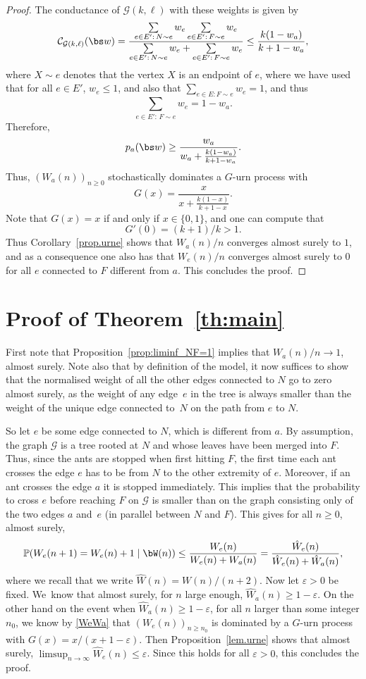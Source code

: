 \begin{proof}
The conductance of $\mathcal G(k,\ell)$ with these weights is given by
\[
\mathcal C_{\mathcal G(k,\ell)}(\bs w) = \frac{\sum\limits_{e\in E':\, N\sim e} w_e\sum\limits_{e\in E':\, F\sim e} w_e}{\sum\limits_{e\in E':\, N\sim e}w_e + \sum\limits_{e\in E':\, F\sim e} w_e}
\leq \frac{k (1-w_a)}{k+1-w_a},
\]
where $X\sim e$ denotes that the vertex $X$ is an endpoint of $e$, where we have used that for all $e\in E'$, $w_e\leq 1$, and also that $\sum_{e\in E\colon F\sim e}w_e = 1$, and thus
\[
\sum_{e\in E':\, F\sim e} w_e = 1- w_a.
\]
Therefore,
\[
p_a(\bs w)\geq\frac{w_a}{w_a +\frac{k (1-w_a)}{k+1-w_a}}.
\]
Thus, $(W_a(n))_{n\ge 0}$ stochastically dominates a $G$-urn process with
\[
G(x)=\frac x{x +\frac{k (1-x)}{k+1-x}}.
\]
Note that $G(x)=x$ if and only if $x\in\{0,1\}$, and one can compute that
\[
G'(0){=(k+1)/k}>1.
\]
Thus {Corollary}~\ref{prop.urne} shows that $W_a(n)/n$ converges almost surely to $1$, and as a consequence one also has that $W_e(n)/n$ converges almost surely to 0 for all $e$ connected to $F$ different from $a$.
This concludes the proof.
\end{proof}

\section{Proof of Theorem~\ref{th:main}}
First note that Proposition~\ref{prop:liminf_NF=1} implies that $W_a(n)/n \to 1$, almost surely.
Note also that by definition of the model, it now suffices to show that the normalised weight of all the other edges connected to $N$ go to zero almost surely, as the weight of any edge~$e$ in the tree is always smaller than the weight of the unique edge connected to~$N$ on the path from $e$ to $N$.

So let $e$ be some edge connected to $N$, which is different from $a$.
By assumption, the graph $\mathcal G$ is a tree rooted at $N$ and whose leaves have been merged into $F$. Thus, since the ants are stopped when first hitting $F$, the first time each ant crosses the edge $e$ has to be from $N$ to the other extremity of $e$. Moreover, if an ant crosses the edge $a$ it is stopped immediately.
This implies that the probability to cross $e$ before reaching $F$ on $\mathcal{G}$
is smaller than on the graph consisting only of the two edges $a$ and~$e$ (in parallel between $N$ and $F$). This gives for all $n\ge 0$, almost surely,
\begin{equation}\label{WeWa}
\mathbb P(W_e(n+1) = W_e(n) + 1 \mid \bW(n)) \le \frac{W_e(n)}{W_e(n) + W_a(n)}=\frac{\hat W_e(n)}{\hat W_e(n) + \hat W_a(n)},
\end{equation}
where we recall that we write $\hat W(n) = W(n)/(n+2)$.
Now let $\varepsilon >0$ be fixed. We~know that almost surely, for $n$ large enough, $\hat W_a(n) \ge 1-\varepsilon$.
On the other hand on the event when $\hat W_a(n) \ge 1 - \varepsilon$, for all $n$ larger than some integer $n_0$, we know by \eqref{WeWa} that
$(W_e(n))_{n\ge n_0}$ is dominated by a $G$-urn process with $G(x) = x/(x+1-\varepsilon)$. Then Proposition~\ref{lem.urne} shows that almost surely, $\limsup_{n\to \infty} \hat W_e(n) \le \varepsilon$.
Since this holds for all $\varepsilon>0$, this concludes the proof.

